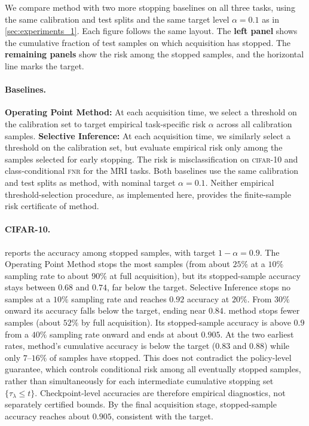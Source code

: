 We compare \gls{method} with two more stopping baselines on all three tasks, using the same calibration and test splits and the same target level $\alpha = 0.1$ as in \cref{sec:experiments_1}. Each figure follows the same layout. The \textbf{left panel} shows the cumulative fraction of test samples on which acquisition has stopped. The \textbf{remaining panels} show the risk among the stopped samples, and the horizontal line marks the target.

\paragraph{Baselines.}
\textbf{Operating Point Method:} At each acquisition time, we select a threshold on the calibration set to target empirical task-specific risk $\alpha$ across all calibration samples.
\textbf{Selective Inference:} At each acquisition time, we similarly select a threshold on the calibration set, but evaluate empirical risk only among the samples selected for early stopping. The risk is misclassification on \textsc{cifar}-10 and class-conditional \textsc{fnr} for the MRI tasks. Both baselines use the same calibration and test splits as \gls{method}, with nominal target $\alpha=0.1$. Neither empirical threshold-selection procedure, as implemented here, provides the finite-sample risk certificate of \gls{method}.

\paragraph{CIFAR-10.}
 reports the accuracy among stopped samples, with target $1-\alpha = 0.9$. The Operating Point Method stops the most samples (from about $25\%$ at a $10\%$ sampling rate to about $90\%$ at full acquisition), but its stopped-sample accuracy stays between $0.68$ and $0.74$, far below the target. Selective Inference stops no samples at a $10\%$ sampling rate and reaches $0.92$ accuracy at $20\%$. From $30\%$ onward its accuracy falls below the target, ending near $0.84$. \gls{method} stops fewer samples (about $52\%$ by full acquisition). Its stopped-sample accuracy is above $0.9$ from a $40\%$ sampling rate onward and ends at about $0.905$. At the two earliest rates, \gls{method}'s cumulative accuracy is below the target ($0.83$ and $0.88$) while only $7$--$16\%$ of samples have stopped. This does not contradict the policy-level guarantee, which controls conditional risk among all eventually stopped samples, rather than simultaneously for each intermediate cumulative stopping set $\{\tau_\lambda \leq t\}$. Checkpoint-level accuracies are therefore empirical diagnostics, not separately certified bounds. By the final acquisition stage, stopped-sample accuracy reaches about $0.905$, consistent with the target.

